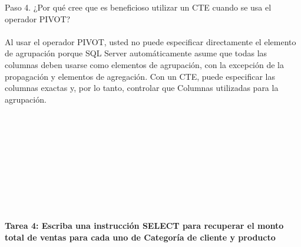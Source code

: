 \begin{flushleft}
Paso 4. ¿Por qué cree que es beneficioso utilizar un CTE cuando se usa el operador PIVOT? \\
\textbf{}\\
Al usar el operador PIVOT, usted no puede especificar directamente el elemento de agrupación porque SQL Server automáticamente asume que todas las columnas deben usarse como elementos de agrupación, con la excepción de la propagación y elementos de agregación. Con un CTE, puede especificar las columnas exactas y, por lo tanto, controlar que Columnas utilizadas para la agrupación.
\textbf{}\\
\textbf{}\\
\textbf{}\\
\textbf{}\\
\textbf{}\\
\textbf{}\\

\textbf{}\\
\textbf{}\\
\textbf{}\\
\textbf{}\\
\textbf{}\\
\textbf{Tarea 4: Escriba una instrucción SELECT para recuperar el monto total de ventas para cada uno de Categoría de cliente y producto}
\textbf{}\\
\textbf{}\\


\end{flushleft}
